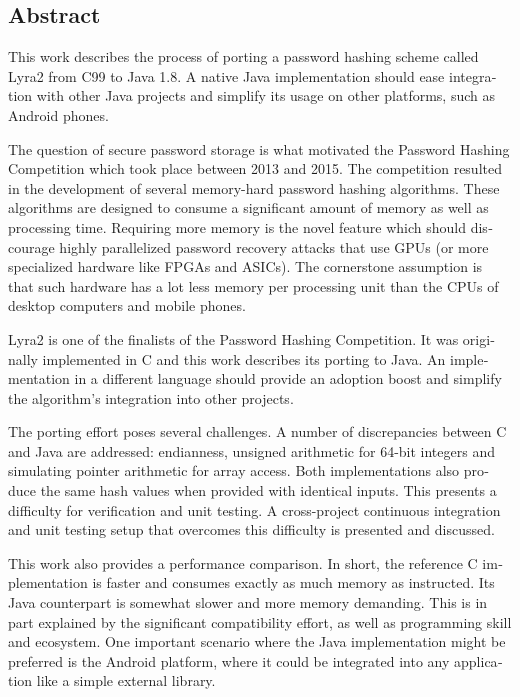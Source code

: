 \cleardoublepage
{}

\begin{otherlanguage}{english}
\chapter*{Abstract}

This work describes the process of porting a password hashing scheme called Lyra2 from C99 to Java 1.8. A native Java implementation should ease integration with other Java projects and simplify its usage on other platforms, such as Android phones.

The question of secure password storage is what motivated the Password Hashing Competition which took place between 2013 and 2015. The competition resulted in the development of several memory-hard password hashing algorithms. These algorithms are designed to consume a significant amount of memory as well as processing time. Requiring more memory is the novel feature which should discourage highly parallelized password recovery attacks that use GPUs (or more specialized hardware like FPGAs and ASICs). The cornerstone assumption is that such hardware has a lot less memory per processing unit than the CPUs of desktop computers and mobile phones.

Lyra2 is one of the finalists of the Password Hashing Competition. It was originally implemented in C and this work describes its porting to Java. An implementation in a different language should provide an adoption boost and simplify the algorithm's integration into other projects.

The porting effort poses several challenges. A number of discrepancies between C and Java are addressed: endianness, unsigned arithmetic for 64-bit integers and simulating pointer arithmetic for array access. Both implementations also produce the same hash values when provided with identical inputs. This presents a difficulty for verification and unit testing. A cross-project continuous integration and unit testing setup that overcomes this difficulty is presented and discussed.

This work also provides a performance comparison. In short, the reference C implementation is faster and consumes exactly as much memory as instructed. Its Java counterpart is somewhat slower and more memory demanding. This is in part explained by the significant compatibility effort, as well as programming skill and ecosystem. One important scenario where the Java implementation might be preferred is the Android platform, where it could be integrated into any application like a simple external library.


\end{otherlanguage}
